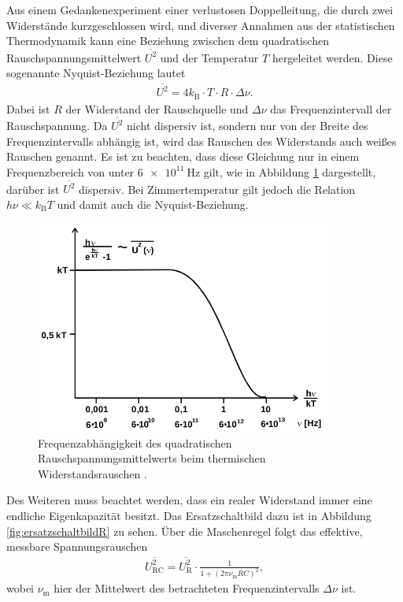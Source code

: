 Aus einem Gedankenexperiment einer verlustosen Doppelleitung, die durch zwei Widerstände
kurzgeschlossen wird, und diverser Annahmen aus der statistischen Thermodynamik kann eine
Beziehung zwischen dem quadratischen Rauschspannungsmittelwert $\overline{U^2}$ und der Temperatur
$T$ hergeleitet werden. Diese sogenannte Nyquist-Beziehung lautet
\begin{align}
  \overline{U^2} = 4 k_\text{B} \cdot T \cdot R \cdot \Delta \nu. \label{eqn:nyquist}
\end{align}
Dabei ist $R$ der Widerstand der Rauschquelle und $\Delta \nu$ das Frequenzintervall der Rauschspannung. Da
$\overline{U^2}$ nicht dispersiv ist, sondern nur von der Breite des Frequenzintervalls abhängig ist, wird das Rauschen des Widerstands auch weißes Rauschen genannt.
Es ist zu beachten, dass diese Gleichung nur in einem Frequenzbereich von unter $\SI{6e11}{\hertz}$ gilt,
wie in Abbildung \ref{fig:freqab} dargestellt, darüber ist $\overline{U^2}$ dispersiv. Bei Zimmertemperatur gilt jedoch die Relation
$h\nu \ll k_\text{B}T$ und damit auch die Nyquist-Beziehung.

\begin{figure}
  \centering
  \includegraphics[height=7cm]{Dickpics/freqab.png}
  \caption{Frequenzabhängigkeit des quadratischen Rauschspannungsmittelwerts beim thermischen Widerstandsrauschen \cite{anleitung}.}
  \label{fig:freqab}
\end{figure}

Des Weiteren muss beachtet werden, dass ein realer Widerstand immer eine endliche Eigenkapazität besitzt. Das Ersatzschaltbild
dazu ist in Abbildung \ref{fig:ersatzschaltbildR} zu sehen. Über die Maschenregel folgt das effektive, messbare Spannungsrauschen
\begin{align}
  \overline{U_{\text{RC}}^2} = \overline{U_{\text{R}}^2} \cdot \frac1{1+(2\pi\nu_\text{m} RC)^2},
\end{align}
wobei $\nu_\text{m}$ hier der Mittelwert des betrachteten Frequenzintervalls $\Delta \nu$ ist.

